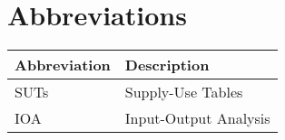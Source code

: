 \newpage
\chapter*{Abbreviations}

\begin{table}[H]\footnotesize
	\centering
	\renewcommand{\arraystretch}{1.5}
	\begin{tabular}{|l|l|}
		\hline
		\textbf{Abbreviation} & \textbf{Description}\\
		\hline
		SUTs & Supply-Use Tables\\
		\hline
		IOA & Input-Output Analysis\\
		\hline		
	\end{tabular}

\end{table}
